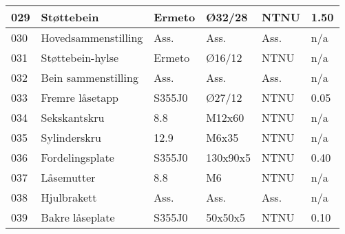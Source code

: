 \begin{tabular}{|l|l|l|l|l|l|}
	029 & Støttebein & Ermeto & Ø32/28 & NTNU & 1.50 \\ \hline
	030 & Hovedsammenstilling & Ass. & Ass. & Ass. & n/a \\ \hline
	031 & Støttebein-hylse & Ermeto & Ø16/12 & NTNU & n/a \\ \hline
	032 & Bein sammenstilling & Ass. & Ass. & Ass. & n/a \\ \hline
	033 & Fremre låsetapp & S355J0 & Ø27/12 & NTNU & 0.05 \\ \hline
	034 & Sekskantskru & 8.8 & M12x60 & NTNU & n/a \\ \hline
	035 & Sylinderskru & 12.9 & M6x35 & NTNU & n/a \\ \hline
	036 & Fordelingsplate & S355J0 & 130x90x5 & NTNU & 0.40 \\ \hline
	037 & Låsemutter & 8.8 & M6 & NTNU & n/a \\ \hline
	038 & Hjulbrakett & Ass. & Ass. & Ass. & n/a \\ \hline
	039 & Bakre låseplate & S355J0 & 50x50x5 & NTNU & 0.10 \\ \hline
\end{tabular}
